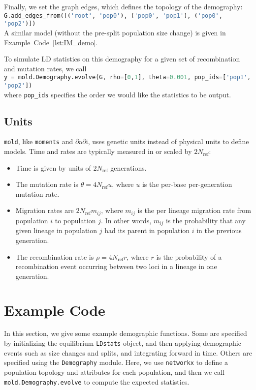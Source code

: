 \documentclass[10pt]{article}
\makeatletter
\newcommand{\dadi}{$\partial$a$\partial$i\xspace}
\newcommand{\mold}{\texttt{mold}\xspace}
\newcommand{\py}[1]{\lstinline[breaklines=true,language=Python, showstringspaces=False]@#1@}
\makeatother
\begin{document}
Finally, we set the graph edges, which defines the topology of the demography: \\
\py{G.add_edges_from([('root', 'pop0'), ('pop0', 'pop1'), ('pop0', 'pop2')])}\\
A similar model (without the pre-split population size change) is given in Example~Code~\ref{lst:IM_demo}.

To simulate LD statistics on this demography for a given set of recombination and mutation rates, we call \\
\py{y = mold.Demography.evolve(G, rho=[0,1], theta=0.001, pop_ids=['pop1', 'pop2'])}\\
 where \py{pop_ids} specifies the order we would like the statistics to be output.


\subsection{Units}

\mold, like \texttt{moments} and \dadi, uses genetic units instead of physical units to define models.
Time and rates are typically measured in or scaled by $2N_\text{ref}$:
\begin{itemize}
\item Time is given by units of $2N_\text{ref}$ generations.
\item The mutation rate is $\theta=4N_\text{ref}u$, where $u$ is the per-base per-generation mutation rate.
\item Migration rates are $2N_\text{ref}m_{ij}$, where $m_{ij}$ is the per lineage migration rate from population $i$ to population $j$. In other words, $m_{ij}$ is the probability that any given lineage in population $j$ had its parent in population $i$ in the previous generation.
\item The recombination rate is $\rho=4N_\text{ref}r$, where $r$ is the probability of a recombination event occurring between two loci in a lineage in one generation.
\end{itemize}

\section{Example Code}

In this section, we give some example demographic functions.
Some are specified by initializing the equilibrium \py{LDstats} object, and then applying demographic events such as size changes and splits, and integrating forward in time.
Others are specified using the \py{Demography} module.
Here, we use \py{networkx} to define a population topology and attributes for each population, and then we call \py{mold.Demography.evolve} to compute the expected statistics.
\end{document}
